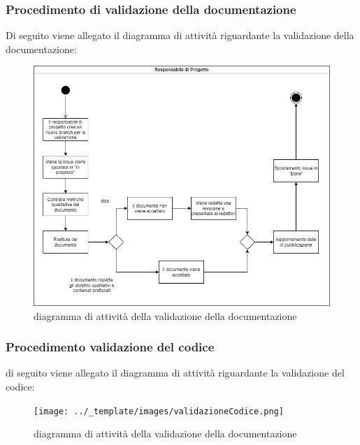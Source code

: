 	\subsubsection{Procedimento di validazione della documentazione}
		Di seguito viene allegato il diagramma di attività riguardante la validazione della documentazione:
		\begin{figure}[hbt!]
	       \centering \includegraphics[width=1.0\textwidth]{../_template/images/Validazione.png}
	        \caption{diagramma di attività della validazione della documentazione}
	    \end{figure}
	   
	\subsubsection{Procedimento validazione del codice}
	    di seguito viene allegato il diagramma di attività riguardante la validazione del codice:
	    \begin{figure}[hbt!]
	       \centering \texttt{[image: ../\_template/images/validazioneCodice.png]}
	        \caption{diagramma di attività della validazione della documentazione}
	    \end{figure}
